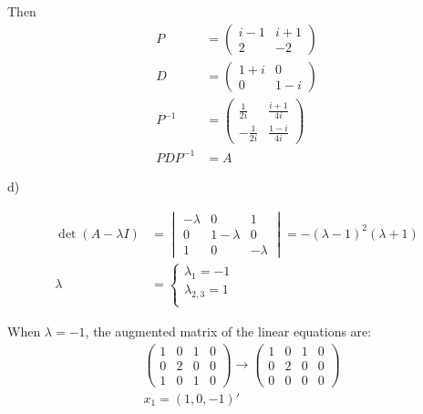 \documentclass[letterpaper, 11pt]{article}
\newcommand{\1}{\mathds{1}}	%
\theoremstyle{definition}
\begin{document}
Then \begin{align*}
    P         & = \begin{pmatrix}
                      i-1 & i+1 \\
                      2   & -2
                  \end{pmatrix}                 \\
    D         & = \begin{pmatrix}
                      1+i & 0   \\
                      0   & 1-i
                  \end{pmatrix}                 \\
    P ^{-1}   & = \begin{pmatrix}
                      \frac{1}{2i}  & \frac{i+1}{4i} \\
                      -\frac{1}{2i} & \frac{1-i}{4i}
                  \end{pmatrix} \\
    PDP ^{-1} & =  A
\end{align*}

d)

\begin{align*}
    \det (A-\lambda I) & = \begin{vmatrix}
                               -\lambda & 0         & 1        \\
                               0        & 1-\lambda & 0        \\
                               1        & 0         & -\lambda
                           \end{vmatrix} = -(\lambda-1)^{2}(\lambda+1) \\
    \lambda            & = \left\{\begin{array}{l}
                                      \lambda_{1} = -1  \\
                                      \lambda_{2,3} = 1 \\
                                  \end{array}\right.
\end{align*}

When $\lambda = -1$, the augmented matrix of the linear equations are: \begin{align*}
     & \left(\begin{array}{ccc|c}
                     1 & 0 & 1 & 0 \\
                     0 & 2 & 0 & 0 \\
                     1 & 0 & 1 & 0
                 \end{array}\right) \to \left(\begin{array}{ccc|c}
                                                  1 & 0 & 1 & 0 \\
                                                  0 & 2 & 0 & 0 \\
                                                  0 & 0 & 0 & 0
                                              \end{array}\right) \\
     & x_{1} = (1,0,-1)'
\end{align*}
\end{document}
